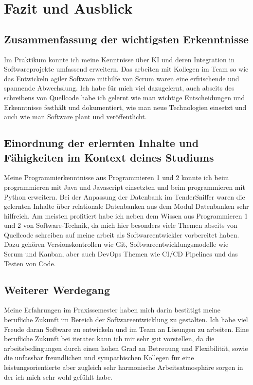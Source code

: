 \chapter{Fazit und Ausblick}


\section{Zusammenfassung der wichtigsten Erkenntnisse}
Im Praktikum konnte ich meine Kenntnisse über KI und deren Integration in Softwareprojekte umfassend erweitern. Das
arbeiten mit Kollegen im Team so wie das Entwickeln agiler Software mithilfe von Scrum waren eine erfrischende und
spannende Abwechslung. Ich habe für mich viel dazugelernt, auch abseits des schreibens von Quellcode habe ich gelernt
wie man wichtige Entscheidungen und Erkenntnisse festhält und dokumentiert, wie man neue Technologien einsetzt und auch
wie man Software plant und veröffentlicht.


\section{Einordnung der erlernten Inhalte und Fähigkeiten im Kontext deines Studiums}
Meine Programmierkenntnisse aus Programmieren 1 und 2 konnte ich beim programmieren mit Java und Javascript einsetzten und beim
programmieren mit Python erweitern. Bei der Anpassung der Datenbank im TenderSniffer waren die gelernten Inhalte über
relationale Datenbanken aus dem Modul Datenbanken sehr hilfreich. Am meisten profitiert habe ich neben dem Wissen aus
Programmieren 1 und 2 von Software-Technik, da mich hier besonders viele Themen abseits von Quellcode schreiben auf
meine arbeit als Softwareentwickler vorbereitet haben. Dazu gehören Versionskontrollen wie Git, Softwareentwicklungsmodelle wie Scrum und
Kanban, aber auch DevOps Themen wie CI/CD Pipelines und das Testen von Code.


\section{Weiterer Werdegang}
Meine Erfahrungen im Praxissemester haben mich darin bestätigt meine berufliche Zukunft im Bereich der
Softwareentwicklung zu gestalten. Ich habe viel Freude daran Software zu entwickeln und im Team an Lösungen zu arbeiten. 
Eine berufliche Zukunft bei iteratec kann ich mir sehr gut vorstellen, da die arbeitsbedingungen durch einen hohen Grad
an Betreuung und Flexibilität, sowie die unfassbar freundlichen und sympathischen Kollegen für eine leistungsorientierte
aber zugleich sehr harmonische Arbeitsatmosphäre sorgen in der ich mich sehr wohl gefühlt habe.